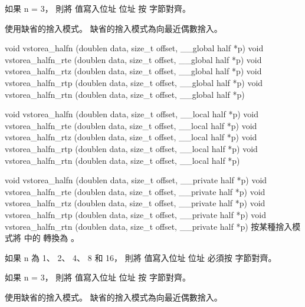 如果 n = 3，
則將  值寫入位址 
位址  按
  字節對齊。

 使用缺省的捨入模式。
缺省的捨入模式為向最近偶數捨入。
\stopbuffer

void vstorea_halfn (doublen data,
	size_t offset,
	__global half *p)
void vstorea_halfn_rte (doublen data,
	size_t offset,
	__global half *p)
void vstorea_halfn_rtz (doublen data,
	size_t offset,
	__global half *p)
void vstorea_halfn_rtp (doublen data,
	size_t offset,
	__global half *p)
void vstorea_halfn_rtn (doublen data,
	size_t offset,
	__global half *p)

void vstorea_halfn (doublen data,
	size_t offset,
	__local half *p)
void vstorea_halfn_rte (doublen data,
	size_t offset,
	__local half *p)
void vstorea_halfn_rtz (doublen data,
	size_t offset,
	__local half *p)
void vstorea_halfn_rtp (doublen data,
	size_t offset,
	__local half *p)
void vstorea_halfn_rtn (doublen data,
	size_t offset,
	__local half *p)

void vstorea_halfn (doublen data,
	size_t offset,
	__private half *p)
void vstorea_halfn_rte (doublen data,
	size_t offset,
	__private half *p)
void vstorea_halfn_rtz (doublen data,
	size_t offset,
	__private half *p)
void vstorea_halfn_rtp (doublen data,
	size_t offset,
	__private half *p)
void vstorea_halfn_rtn (doublen data,
	size_t offset,
	__private half *p)
\stopbuffer
{}
按某種捨入模式將  中的  轉換為 。

如果 n 為 1、 2、 4、 8 和 16，
則將  值寫入位址 
位址  必須按
  字節對齊。

如果 n = 3，
則將  值寫入位址 
位址  按
  字節對齊。

 使用缺省的捨入模式。
缺省的捨入模式為向最近偶數捨入。
\stopbuffer


\startCLFD
{}
\stopCLFD

